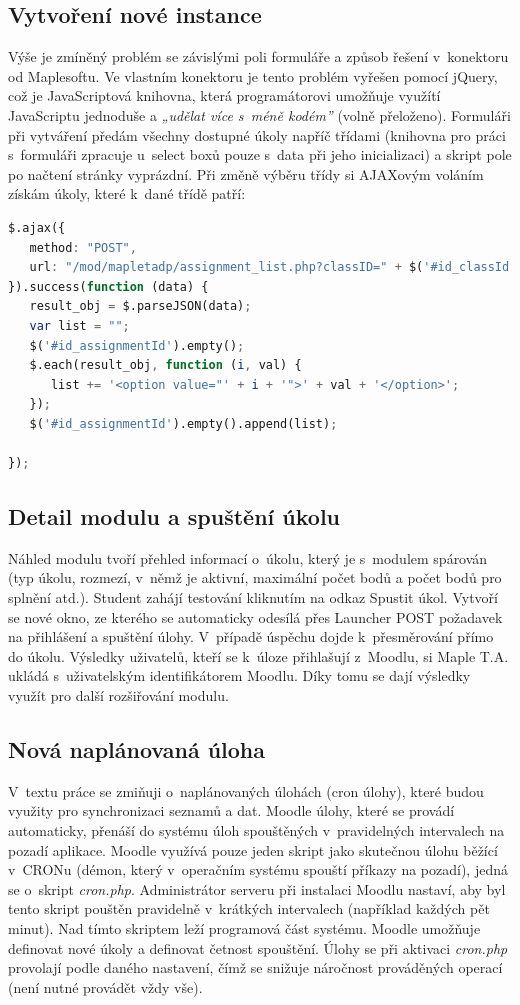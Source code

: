 \documentclass[
print,
  11pt,
  table,   
  nolof,    
  nolot,
  oneside,final
]{fithesis3}
\begin{document}
\subsection{Vytvoření nové instance}
Výše je zmíněný problém se závislými poli formuláře a způsob řešení v~konektoru od Maplesoftu. Ve vlastním konektoru je tento problém vyřešen pomocí jQuery, což je JavaScriptová knihovna, která programátorovi umožňuje využítí JavaScriptu jednoduše a \emph{„udělat více s~méně kodém”}\cite{jquery} (volně přeloženo). Formuláři při vytváření předám všechny dostupné úkoly napříč třídami (knihovna pro práci s~formuláři zpracuje u~select boxů pouze s~data při jeho inicializaci) a skript pole po načtení stránky vyprázdní. Při změně výběru třídy si AJAXovým voláním získám úkoly, které k~dané třídě patří:
\begin{lstlisting}[language=Octave, caption=Volání PHP za pomoci AJAXu; získání hodnot pro závislé pole formuláře.]    
$.ajax({
   method: "POST",
   url: "/mod/mapletadp/assignment_list.php?classID=" + $('#id_classId').val()
}).success(function (data) {
   result_obj = $.parseJSON(data);
   var list = "";
   $('#id_assignmentId').empty();
   $.each(result_obj, function (i, val) {
      list += '<option value="' + i + '">' + val + '</option>';
   });
   $('#id_assignmentId').empty().append(list);

});
\end{lstlisting}

		\subsection{Detail modulu a spuštění úkolu}
Náhled modulu tvoří přehled informací o~úkolu, který je s~modulem spárován (typ úkolu, rozmezí, v~němž je aktivní, maximální počet bodů a počet bodů pro splnění atd.). Student zahájí testování kliknutím na odkaz Spustit úkol. Vytvoří se nové okno, ze kterého se automaticky odesílá přes Launcher POST požadavek na přihlášení a spuštění úlohy. V~případě úspěchu dojde k~přesměrování přímo do úkolu. Výsledky uživatelů, kteří se k~úloze přihlašují z~Moodlu, si Maple T.A. ukládá s~uživatelským identifikátorem Moodlu. Díky tomu se dají výsledky využít pro další rozšiřování modulu.

		\subsection{Nová naplánovaná úloha}
V~textu práce se zmiňuji o~naplánovaných úlohách (cron úlohy), které budou využity pro synchronizaci seznamů a dat. Moodle úlohy, které se provádí automaticky, přenáší do systému úloh spouštěných v~pravidelných intervalech na pozadí aplikace. Moodle využívá pouze jeden skript jako skutečnou úlohu běžící v~CRONu (démon, který v~operačním systému spouští příkazy na pozadí), jedná se o~skript \emph{cron.php}. Administrátor serveru při instalaci Moodlu nastaví, aby byl tento skript pouštěn pravidelně v~krátkých intervalech (například každých pět minut). Nad tímto skriptem leží programová část systému. Moodle umožňuje definovat nové úkoly a definovat četnost spouštění. Úlohy se při aktivaci\emph{ cron.php} provolají podle daného nastavení, čímž se snižuje náročnost prováděných operací (není nutné provádět vždy vše). 
\end{document}
